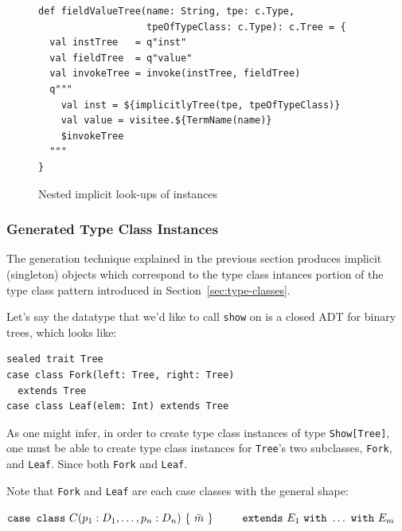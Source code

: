 \documentclass[preprint,nocopyrightspace]{sigplanconf}
\begin{document}
\begin{figure}
\centering
\begin{lstlisting}
def fieldValueTree(name: String, tpe: c.Type,
                   tpeOfTypeClass: c.Type): c.Tree = {
  val instTree   = q"inst"
  val fieldTree  = q"value"
  val invokeTree = invoke(instTree, fieldTree)
  q"""
    val inst = ${implicitlyTree(tpe, tpeOfTypeClass)}
    val value = visitee.${TermName(name)}
    $invokeTree
  """
}
\end{lstlisting}
  \caption{Nested implicit look-ups of instances}
  \label{fig:macro-field-value}
\end{figure}




\subsubsection{Generated Type Class Instances}
\label{sec:generated-type-class-instances}

The generation technique explained in the previous section produces implicit
(singleton) objects which correspond to the type class intances portion of the
type class pattern introduced in Section~\ref{sec:type-classes}.

Let's say the datatype that we'd like to call \verb|show| on is a closed
ADT for binary trees, which looks like:

\begin{lstlisting}
sealed trait Tree
case class Fork(left: Tree, right: Tree)
  extends Tree
case class Leaf(elem: Int) extends Tree
\end{lstlisting}
\noindent

As one might infer, in order to create type class instances of type
\verb|Show[Tree]|, one must be able to create type class instances for
\verb|Tree|'s two subclasses, \verb|Fork|, and \verb|Leaf|. Since both
\verb|Fork| and \verb|Leaf|.

Note that \verb|Fork| and \verb|Leaf| are each case classes with the general
shape:

\begin{math}
\texttt{case class}~C(p_1: D_1, \ldots, p_n: D_n)~\{~\bar{m}~\} \\
\texttt{~~~~~extends}~E_1~\texttt{with}~ \ldots ~\texttt{with}~E_m
\end{math}
\noindent
\end{document}
